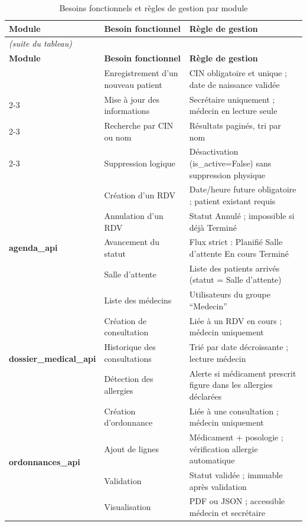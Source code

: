\documentclass[12pt,a4paper]{report}
\begin{document}
\begin{longtable}{|p{3.5cm}|p{5cm}|p{5.5cm}|}
  \caption{Besoins fonctionnels et règles de gestion par module} \\
  \hline
  \rowcolor{medaccent}
  \textbf{Module} & \textbf{Besoin fonctionnel} & \textbf{Règle de gestion} \\
  \hline
  \endfirsthead
  \multicolumn{3}{l}{\small\textit{(suite du tableau)}} \\
  \hline
  \rowcolor{medaccent}
  \textbf{Module} & \textbf{Besoin fonctionnel} & \textbf{Règle de gestion} \\
  \hline
  \endhead
  \hline
  \endfoot

  \multirow{4}{*}{\textbf{patients\_api}} &
    Enregistrement d'un nouveau patient &
    CIN obligatoire et unique ; date de naissance validée \\
  \cline{2-3}
  & Mise à jour des informations & Secrétaire uniquement ; médecin en lecture seule \\
  \cline{2-3}
  & Recherche par CIN ou nom & Résultats paginés, tri par nom \\
  \cline{2-3}
  & Suppression logique & Désactivation (is\_active=False) sans suppression physique \\
  \hline

  \multirow{5}{*}{\textbf{agenda\_api}} &
    Création d'un RDV &
    Date/heure future obligatoire ; patient existant requis \\
  \cline{2-3}
  & Annulation d'un RDV & Statut \textrightarrow{} Annulé ; impossible si déjà Terminé \\
  \cline{2-3}
  & Avancement du statut & Flux strict : Planifié \textrightarrow{} Salle d'attente \textrightarrow{} En cours \textrightarrow{} Terminé \\
  \cline{2-3}
  & Salle d'attente & Liste des patients arrivés (statut = Salle d'attente) \\
  \cline{2-3}
  & Liste des médecins & Utilisateurs du groupe ``Medecin'' \\
  \hline

  \multirow{3}{*}{\textbf{dossier\_medical\_api}} &
    Création de consultation &
    Liée à un RDV en cours ; médecin uniquement \\
  \cline{2-3}
  & Historique des consultations & Trié par date décroissante ; lecture médecin \\
  \cline{2-3}
  & Détection des allergies & Alerte si médicament prescrit figure dans les allergies déclarées \\
  \hline

  \multirow{4}{*}{\textbf{ordonnances\_api}} &
    Création d'ordonnance &
    Liée à une consultation ; médecin uniquement \\
  \cline{2-3}
  & Ajout de lignes & Médicament + posologie ; vérification allergie automatique \\
  \cline{2-3}
  & Validation & Statut \textrightarrow{} validée ; immuable après validation \\
  \cline{2-3}
  & Visualisation & PDF ou JSON ; accessible médecin et secrétaire \\
  \hline
\end{longtable}
\end{document}

